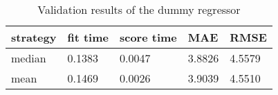 \begin{table}[H]
    \centering
    \begin{tabular}{l|llll}
    \toprule
    \textbf{strategy} & \textbf{fit time} & \textbf{score time} & \textbf{MAE} & \textbf{RMSE} \\ \midrule
    median            & 0.1383            & 0.0047              & 3.8826       & 4.5579  \\
    mean              & 0.1469            & 0.0026              & 3.9039       & 4.5510  \\
    \bottomrule
    \end{tabular}%
    \caption{Validation results of the dummy regressor}
    \label{tab:val_dummy}
    \end{table}